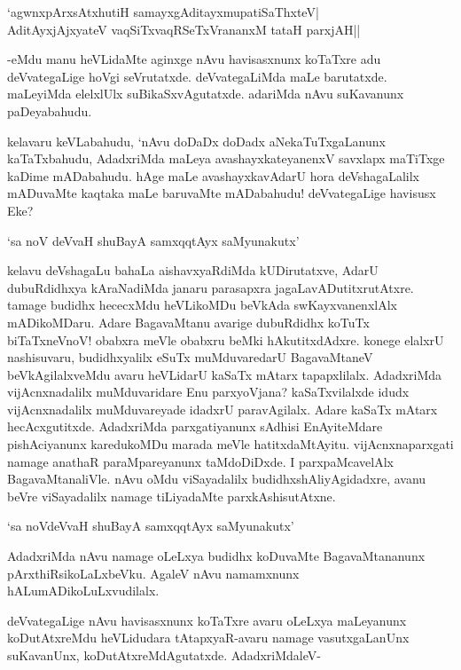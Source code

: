 \begin{shloka}
`agwnxpArxsAtxhutiH samayxgAditayxmupatiSaThxteV|\\
AditAyxjAjxyateV vaqSiTxvaqRSeTxVrananxM tataH parxjAH||
\end{shloka}

-eMdu manu heVLidaMte aginxge nAvu havisasxnunx koTaTxre adu deVvategaLige hoVgi seVrutatxde. deVvategaLiMda maLe barutatxde. maLeyiMda elelxlUlx suBikaSxvAgutatxde. adariMda nAvu suKavanunx paDeyabahudu.

kelavaru keVLabahudu, `nAvu doDaDx doDadx aNekaTuTxgaLanunx kaTaTxbahudu, AdadxriMda maLeya avashayxkateyanenxV savxlapx maTiTxge kaDime mADabahudu. hAge maLe avashayxkavAdarU hora deVshagaLalilx mADuvaMte kaqtaka maLe baruvaMte mADabahudu! deVvategaLige havisusx Eke?

\begin{shloka}
`sa noV deVvaH shuBayA samxqqtAyx saMyunakutx'
\end{shloka}

kelavu deVshagaLu bahaLa aishavxyaRdiMda kUDirutatxve, AdarU dubuRdidhxya kAraNadiMda janaru parasapxra jagaLavADutitxrutAtxre. tamage budidhx hececxMdu heVLikoMDu beVkAda swKayxvanenxlAlx mADikoMDaru. Adare BagavaMtanu avarige dubuRdidhx koTuTx biTaTxneVnoV! obabxra meVle obabxru beMki hAkutitxdAdxre. konege elalxrU nashisuvaru, budidhxyalilx eSuTx muMduvaredarU BagavaMtaneV beVkAgilalxveMdu avaru heVLidarU kaSaTx mAtarx tapapxlilalx. AdadxriMda vijAcnxnadalilx muMduvaridare Enu parxyoVjana? kaSaTxvilalxde idudx vijAcnxnadalilx muMduvareyade idadxrU paravAgilalx. Adare kaSaTx mAtarx hecAcxgutitxde. AdadxriMda parxgatiyanunx sAdhisi EnAyiteMdare pishAciyanunx karedukoMDu marada meVle hatitxdaMtAyitu. vijAcnxnaparxgati namage anathaR paraMpareyanunx taMdoDiDxde. I parxpaMcavelAlx BagavaMtanaliVle. nAvu oMdu viSayadalilx budidhxshAliyAgidadxre, avanu beVre viSayadalilx namage tiLiyadaMte parxkAshisutAtxne.

\begin{shloka}
`sa noVdeVvaH shuBayA samxqqtAyx saMyunakutx'
\end{shloka} 

AdadxriMda nAvu namage oLeLxya budidhx koDuvaMte BagavaMtananunx pArxthiRsikoLaLxbeVku. AgaleV nAvu namamxnunx hALumADikoLuLxvudilalx.

deVvategaLige nAvu havisasxnunx koTaTxre avaru oLeLxya maLeyanunx koDutAtxreMdu heVLidudara tAtapxyaR-avaru namage vasutxgaLanUnx suKavanUnx,  koDutAtxreMdAgutatxde. AdadxriMdaleV-

